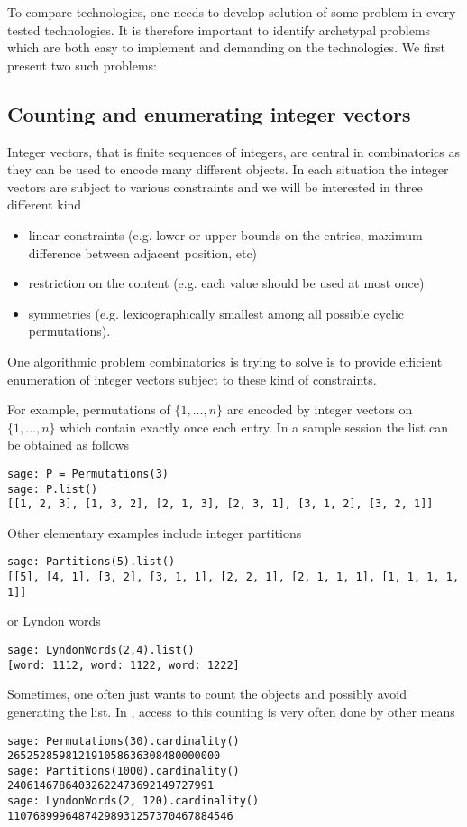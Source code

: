\documentclass{deliverablereport}
\begin{document}
To compare technologies, one needs to develop solution of some problem in
every tested technologies. It is therefore important to identify archetypal
problems which are both easy to implement and demanding on the technologies.
We first present two such problems:
\subsection{Counting and enumerating integer vectors}
Integer vectors, that is finite sequences of integers, are central
in combinatorics as they can be used to encode many different
objects. In each situation the integer vectors are subject to various
constraints and we will be interested in three different kind
\begin{itemize}
\item linear constraints (e.g. lower or upper bounds on the entries,
maximum difference between adjacent position, etc)
\item restriction on the content (e.g. each value should be used
at most once)
\item symmetries (e.g. lexicographically smallest among all possible
cyclic permutations).
\end{itemize}
One algorithmic problem combinatorics is trying to solve is to provide
efficient enumeration of integer vectors subject to these kind of
constraints.

For example, permutations of $\{1, \ldots, n\}$ are encoded by integer vectors
on $\{1, \ldots, n\}$ which contain exactly once each entry. In a sample
\Sage session the list can be obtained as follows
\begin{verbatim}
sage: P = Permutations(3)
sage: P.list()
[[1, 2, 3], [1, 3, 2], [2, 1, 3], [2, 3, 1], [3, 1, 2], [3, 2, 1]]
\end{verbatim}
Other elementary examples include integer partitions
\begin{verbatim}
sage: Partitions(5).list()
[[5], [4, 1], [3, 2], [3, 1, 1], [2, 2, 1], [2, 1, 1, 1], [1, 1, 1, 1, 1]]
\end{verbatim}
or Lyndon words
\begin{verbatim}
sage: LyndonWords(2,4).list()
[word: 1112, word: 1122, word: 1222]
\end{verbatim}

Sometimes, one often just wants to count the objects and possibly avoid
generating the list. In \Sage, access to this counting is very often
done by other means
\begin{verbatim}
sage: Permutations(30).cardinality()
265252859812191058636308480000000
sage: Partitions(1000).cardinality()
24061467864032622473692149727991
sage: LyndonWords(2, 120).cardinality()
11076899964874298931257370467884546
\end{verbatim}
\end{document}
